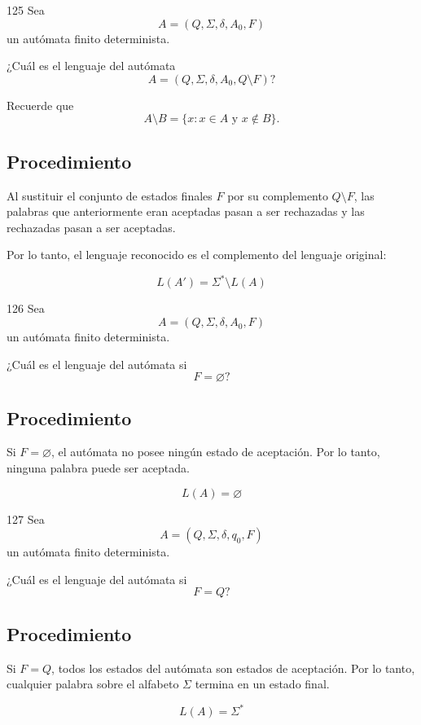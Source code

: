 \documentclass[12pt]{article}
\begin{document}
\begin{enunciado}{125}
Sea
\[
A=(Q,\Sigma,\delta,A_0,F)
\]
un autómata finito determinista.

¿Cuál es el lenguaje del autómata
\[
A=(Q,\Sigma,\delta,A_0,Q\setminus F)?
\]

Recuerde que
\[
A\setminus B=\{x:x\in A\text{ y }x\notin B\}.
\]
\end{enunciado}


\subsection*{Procedimiento}

Al sustituir el conjunto de estados finales $F$ por su complemento
$Q\setminus F$, las palabras que anteriormente eran aceptadas pasan a
ser rechazadas y las rechazadas pasan a ser aceptadas.

Por lo tanto, el lenguaje reconocido es el complemento del lenguaje
original:

\[
\boxed{L(A')=\Sigma^*\setminus L(A)}
\]


\begin{enunciado}{126}
Sea
\[
A=(Q,\Sigma,\delta,A_0,F)
\]
un autómata finito determinista.

¿Cuál es el lenguaje del autómata si
\[
F=\varnothing?
\]
\end{enunciado}
\subsection*{Procedimiento}

Si $F=\varnothing$, el autómata no posee ningún estado de aceptación.
Por lo tanto, ninguna palabra puede ser aceptada.

\[
\boxed{L(A)=\varnothing}
\]

\begin{enunciado}{127}
Sea
\[
A=(Q,\Sigma,\delta,q_0,F)
\]
un autómata finito determinista.

¿Cuál es el lenguaje del autómata si
\[
F=Q?
\]
\end{enunciado}
\subsection*{Procedimiento}

Si $F=Q$, todos los estados del autómata son estados de aceptación.
Por lo tanto, cualquier palabra sobre el alfabeto $\Sigma$ termina en
un estado final.

\[
\boxed{L(A)=\Sigma^*}
\]
\end{document}
